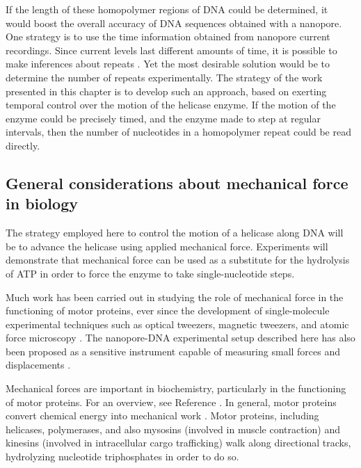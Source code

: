 If the length of these homopolymer regions of DNA could be determined, it would boost the overall accuracy of DNA sequences obtained with a nanopore.  One strategy is to use the time information obtained from nanopore current recordings.  Since current levels last different amounts of time, it is possible to make inferences about repeats \citep{Sarkozy2017}.  Yet the most desirable solution would be to determine the number of repeats experimentally.  The strategy of the work presented in this chapter is to develop such an approach, based on exerting temporal control over the motion of the helicase enzyme.  If the motion of the enzyme could be precisely timed, and the enzyme made to step at regular intervals, then the number of nucleotides in a homopolymer repeat could be read directly.

\subsection{General considerations about mechanical force in biology}

The strategy employed here to control the motion of a helicase along DNA will be to advance the helicase using applied mechanical force.  Experiments will demonstrate that mechanical force can be used as a substitute for the hydrolysis of ATP in order to force the enzyme to take single-nucleotide steps.

Much work has been carried out in studying the role of mechanical force in the functioning of motor proteins, ever since the development of single-molecule experimental techniques such as optical tweezers, magnetic tweezers, and atomic force microscopy \citep{Neuman2008}.  The nanopore-DNA experimental setup described here has also been proposed as a sensitive instrument capable of measuring small forces and displacements \citep{Derrington2015}.

Mechanical forces are important in biochemistry, particularly in the functioning of motor proteins.  For an overview, see Reference .  In general, motor proteins convert chemical energy into mechanical work \citep{Oster2003}.  Motor proteins, including helicases, polymerases, and also mysosins (involved in muscle contraction) and kinesins (involved in intracellular cargo trafficking) walk along directional tracks, hydrolyzing nucleotide triphosphates in order to do so.


